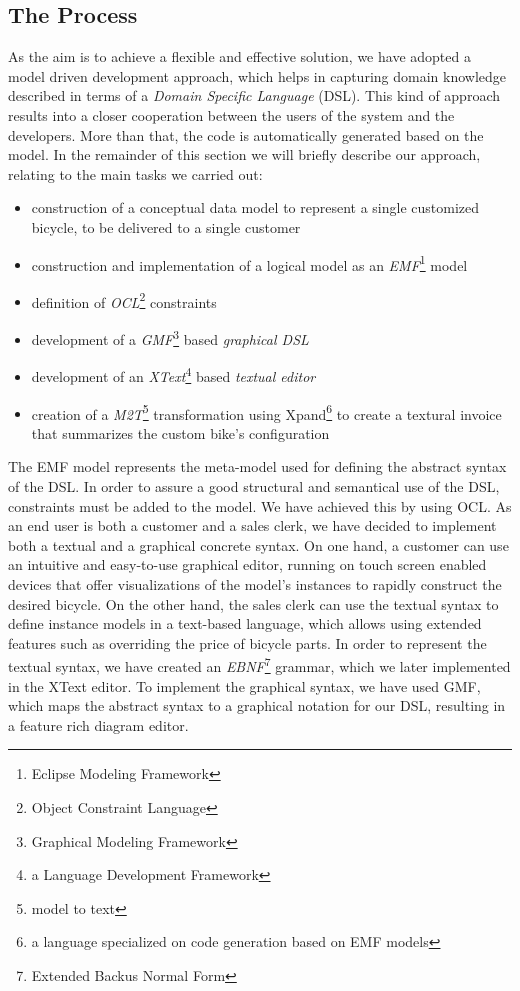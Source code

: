 \subsection{The Process}
\noindent As the aim is to achieve a flexible and effective solution, we have
adopted a model driven development approach, which helps in capturing domain
knowledge described in terms of a \emph{Domain Specific Language} (DSL). This
kind of approach results into a closer cooperation between the users of the
system and the developers. More than that, the code is automatically generated
based on the model. In the remainder of this section we will briefly describe
our approach, relating to the main tasks we carried out:
\begin{itemize}
  \item construction of a conceptual data model to represent a single customized
  bicycle, to be delivered to a single customer
  \item construction and implementation of a logical model as an
  \emph{EMF}\footnote{Eclipse Modeling Framework} model
  \item definition of \emph{OCL}\footnote{Object Constraint Language}
  constraints
  \item development of a \emph{GMF}\footnote{Graphical Modeling Framework} based
  \emph{graphical DSL}
  \item development of an \emph{XText}\footnote{a Language Development
  Framework} based \emph{textual editor}
  \item creation of a \emph{M2T}\footnote{model to text} transformation using
  Xpand\footnote{a language specialized on code generation based on EMF models}
  to create a textural invoice that summarizes the custom bike's configuration
\end{itemize} 

\noindent The EMF model represents the meta-model used for
defining the abstract syntax of the DSL. In order to assure a good structural
and semantical use of the DSL, constraints must be added to the model. We have
achieved this by using OCL. As an end user is both a customer and a sales
clerk, we have decided to implement both a textual and a graphical concrete syntax. On
one hand, a customer can use an intuitive and easy-to-use graphical
editor, running on touch screen enabled devices that offer visualizations
of the model's instances to rapidly construct the desired bicycle. On the other
hand, the sales clerk can use the textual syntax to define instance models in a
text-based language, which allows using extended features such as overriding
the price of bicycle parts. In order to represent the textual syntax, we have
created an \emph{EBNF}\footnote{Extended Backus Normal Form} grammar, which we later 
implemented in the XText editor. To implement the graphical syntax, we have used GMF, 
which maps the abstract syntax to a graphical notation for our DSL, resulting in
a feature rich diagram editor.\\

